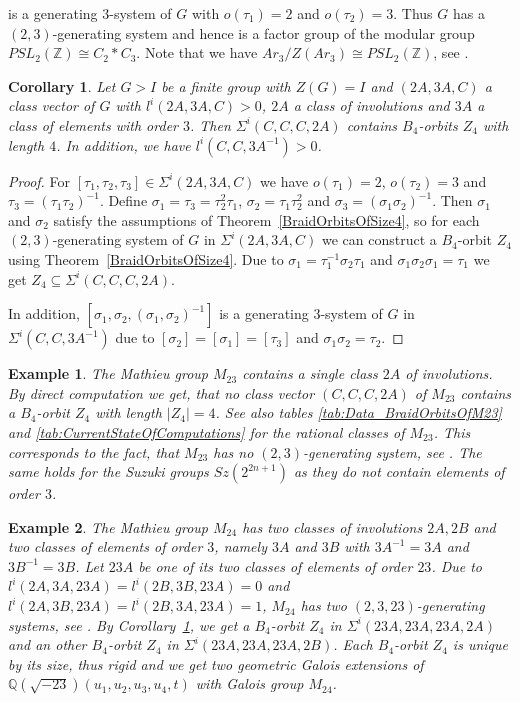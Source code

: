 \documentclass[12pt,a4paper]{article}
\newtheorem{corollary}{Corollary}[section]
\newtheorem{example}{Example}[section]
\numberwithin{equation}{section}
\numberwithin{table}{section}
\begin{document}
is a generating $3$-system of $G$ with $o(\tau_1)=2$ and $o(\tau_2)=3$.
Thus $G$ has a $(2,3)$-generating system and hence is a factor group of the modular
group $PSL_2(\mathbb{Z}) \cong C_2 \ast C_3$.
Note that we have $Ar_3/Z(Ar_3) \cong PSL_2(\mathbb{Z})$, see \cite[Theorem A.2]{RefKT2008}.
%
\begin{corollary}
\label{Systems23ToBraidOrbitsOfSize4}
Let $G>I$ be a finite group with $Z(G)=I$ and $(2A,3A,C)$ a class vector of $G$ with $l^i(2A,3A,C)>0$,
$2A$ a class of involutions and $3A$ a class of elements with order $3$.
Then $\Sigma^i(C,C,C,2A)$ contains $B_4$-orbits $Z_4$ with length $4$.
In addition, we have $l^i(C,C,3A^{-1})>0$.
\end{corollary}
\begin{proof}
For $[\tau_1, \tau_2, \tau_3] \in \Sigma^i(2A,3A,C)$ we have $o(\tau_1)=2$, $o(\tau_2)=3$
and $\tau_3 = (\tau_1 \tau_2)^{-1}$.
Define $\sigma_1 = \tau_3 = \tau_2^2 \tau_1$, $\sigma_2 = \tau_1 \tau_2^2$ and $\sigma_3 = (\sigma_1 \sigma_2)^{-1}$.
Then $\sigma_1$ and $\sigma_2$ satisfy the assumptions of Theorem~\ref{BraidOrbitsOfSize4}, so for each
$(2,3)$-generating system of $G$ in $\Sigma^i(2A,3A,C)$ we can construct a $B_4$-orbit $Z_4$
using Theorem~\ref{BraidOrbitsOfSize4}.
Due to $\sigma_1 = \tau_1^{-1} \sigma_2 \tau_1$ and $\sigma_1 \sigma_2 \sigma_1 = \tau_1$ we get
$Z_4 \subseteq \Sigma^i(C,C,C,2A)$.
\par
\noindent
In addition, $[\sigma_1, \sigma_2, (\sigma_1, \sigma_2)^{-1}]$ is a generating $3$-system of $G$
in $\Sigma^i(C,C,3A^{-1})$ due to  $[\sigma_2] = [\sigma_1] = [\tau_3]$ 
and $\sigma_1 \sigma_2 = \tau_2$.
\end{proof}
%
\begin{example}
\label{M23_CCC2A_NoZ4}
The Mathieu group $M_{23}$ contains a single class $2A$ of involutions. By direct computation we get, that
no class vector $(C,C,C,2A)$ of $M_{23}$ contains a $B_4$-orbit $Z_4$ with length $\vert Z_4 \vert = 4$.
See also tables \ref{tab:Data_BraidOrbitsOfM23} and \ref{tab:CurrentStateOfComputations} for the rational classes of $M_{23}$.
This corresponds to the fact, that $M_{23}$ has no $(2,3)$-generating system, see \cite[Anhang 1.2]{RefHae1987}.
The same holds for the Suzuki groups $Sz(2^{2n+1})$ as they do not contain elements of order $3$.
\end{example}
%
\begin{example}
\label{M24_CCC2_Z4}
The Mathieu group $M_{24}$ has two classes of involutions $2A, 2B$ and two classes of elements of order $3$, 
namely $3A$ and $3B$ with $3A^{-1}=3A$ and $3B^{-1}=3B$.
Let $23A$ be one of its two classes of elements of order $23$. Due to
$l^i(2A,3A,23A) = l^i(2B,3B,23A) = 0$ and $l^i(2A,3B,23A) = l^i(2B,3A,23A) = 1$,
$M_{24}$ has two $(2,3,23)$-generating systems, see \cite[Anhang 2.2]{RefHae1987}.
By Corollary~\ref{Systems23ToBraidOrbitsOfSize4}, we get a $B_4$-orbit $Z_4$ in $\Sigma^i(23A,23A,23A,2A)$
and an other $B_4$-orbit $Z_4$ in $\Sigma^i(23A,23A,23A,2B)$.
Each $B_4$-orbit $Z_4$ is unique by its size, thus rigid and we get
two geometric Galois extensions of $\mathbb{Q}(\sqrt{-23})(u_1,u_2,u_3,u_4,t)$ with Galois group $M_{24}$.
\end{example}
\end{document}
